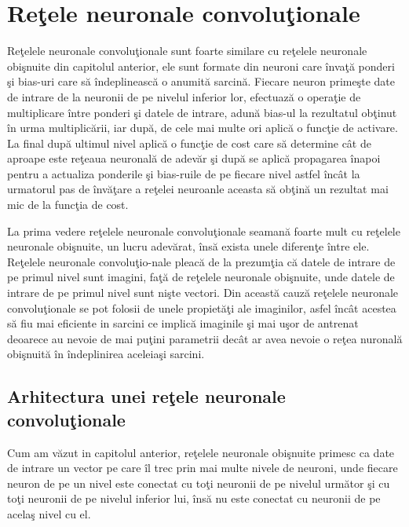 \chapter{Re\c{t}ele neuronale convolu\c{t}ionale}

Re\c{t}elele neuronale convolu\c{t}ionale  sunt foarte similare cu re\c{t}elele neuronale obi\c{s}nuite din capitolul anterior, ele sunt formate din neuroni care \^{i}nva\c{t}\u{a} ponderi \c{s}i bias-uri care s\u{a} \^{i}ndeplineasc\u{a} o anumit\u{a} sarcin\u{a}. Fiecare neuron prime\c{s}te date de intrare de la neuronii de pe nivelul inferior lor, efectuaz\u{a} o opera\c{t}ie de multiplicare \^{i}ntre ponderi \c{s}i datele de intrare, adun\u{a} bias-ul la rezultatul ob\c{t}inut \^{i}n urma multiplic\u{a}rii, iar dup\u{a}, de cele mai multe ori aplic\u{a} o func\c{t}ie de activare. La final dup\u{a} ultimul nivel aplic\u{a} o func\c{t}ie de cost care s\u{a} determine c\^{a}t de aproape este re\c{t}eaua neuronal\u{a} de adev\u{a}r \c{s}i dup\u{a} se aplic\u{a} propagarea \^{i}napoi pentru a actualiza ponderile \c{s}i bias-ruile de pe fiecare nivel astfel \^{i}nc\^{a}t la urmatorul pas de \^{i}nv\u{a}\c{t}are a re\c{t}elei neuroanle aceasta s\u{a} ob\c{t}in\u{a} un rezultat mai mic de la func\c{t}ia de cost.

La prima vedere re\c{t}elele neuronale convolu\c{t}ionale seaman\u{a} foarte mult cu re\c{t}elele neuronale obi\c{s}nuite, un lucru adev\u{a}rat, \^{i}ns\u{a} exista unele diferen\c{t}e \^{i}ntre ele. Re\c{t}elele neuronale convolu\c{t}io-nale pleac\u{a} de la prezum\c{t}ia c\u{a} datele de intrare de pe primul nivel sunt imagini, fa\c{t}\u{a} de re\c{t}elele neuronale obi\c{s}nuite, unde datele de intrare de pe primul nivel sunt ni\c{s}te vectori. Din aceast\u{a} cauz\u{a} re\c{t}elele neuronale convolu\c{t}ionale se pot folosii de unele propiet\u{a}\c{t}i ale imaginilor, asfel \^{i}nc\^{a}t acestea s\u{a} fiu mai eficiente in sarcini ce implic\u{a} imaginile \c{s}i mai u\c{s}or de antrenat deoarece au nevoie de mai pu\c{t}ini parametrii dec\^{a}t ar avea nevoie o re\c{t}ea nuronal\u{a} obi\c{s}nuit\u{a} \^{i}n \^{i}ndeplinirea aceleia\c{s}i sarcini.

\section{Arhitectura unei re\c{t}ele neuronale convolu\c{t}ionale}

Cum am v\u{a}zut in capitolul anterior, re\c{t}elele neuronale obi\c{s}nuite primesc ca date de intrare un  vector pe care \^{i}l trec prin mai multe nivele de neuroni, unde fiecare neuron de pe un nivel este conectat cu to\c{t}i neuronii de pe nivelul urm\u{a}tor \c{s}i cu to\c{t}i neuronii de pe nivelul inferior lui, \^{i}ns\u{a} nu este conectat cu neuronii de pe acela\c{s} nivel cu el. 

